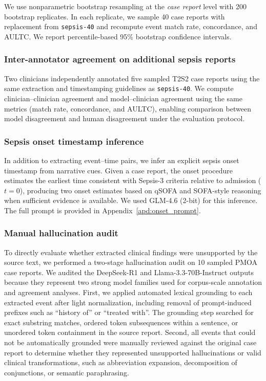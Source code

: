 \documentclass[pmlr,twocolumn,10pt]{jmlr} %
\begin{document}
We use nonparametric bootstrap resampling at the \emph{case report} level with 200 bootstrap replicates.
In each replicate, we sample 40 case reports with replacement from \texttt{sepsis-40} and recompute event match rate, concordance, and AULTC.
We report percentile-based 95\% bootstrap confidence intervals.

\subsubsection{Inter-annotator agreement on additional sepsis reports}
\label{sec:iaa_methods}
Two clinicians independently annotated five sampled T2S2 case reports using the same extraction and timestamping guidelines as \texttt{sepsis-40}.
We compute clinician--clinician agreement and model--clinician agreement using the same metrics (match rate, concordance, and AULTC), enabling comparison between model disagreement and human disagreement under the evaluation protocol.

\subsubsection{Sepsis onset timestamp inference}
\label{sec:onset-inference}
In addition to extracting event--time pairs, we infer an explicit sepsis onset timestamp from narrative cues.
Given a case report, the onset procedure estimates the earliest time consistent with Sepsis-3 criteria relative to admission ($t=0$), producing two onset estimates based on qSOFA and SOFA-style reasoning when sufficient evidence is available.
We used GLM-4.6 (2-bit) for this inference.
The full prompt is provided in Appendix~\ref{apd:onset_prompt}.

\vspace{-1em}
\subsubsection{Manual hallucination audit}
\label{sec:hallucination_audit_methods}
To directly evaluate whether extracted clinical findings were unsupported by the source text, we performed a two-stage hallucination audit on 10 sampled PMOA case reports.
We audited the DeepSeek-R1 and Llama-3.3-70B-Instruct outputs because they represent two strong model families used for corpus-scale annotation and agreement analyses.
First, we applied automated lexical grounding to each extracted event after light normalization, including removal of prompt-induced prefixes such as ``history of'' or ``treated with''.
The grounding step searched for exact substring matches, ordered token subsequences within a sentence, or unordered token containment in the source report.
Second, all events that could not be automatically grounded were manually reviewed against the original case report to determine whether they represented unsupported hallucinations or valid clinical transformations, such as abbreviation expansion, decomposition of conjunctions, or semantic paraphrasing.
\end{document}
